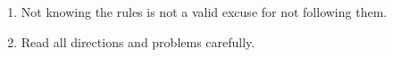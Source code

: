 \documentclass[12pt,fleqn]{exam}
\begin{document}
\begin{tcolorbox}
\begin{minipage}{6.5in}
\begin{enumerate}
    \item Not knowing the rules is not a valid excuse for not following them.
    
    \item Read all directions and problems carefully. 
    \end{enumerate} 
    \end{minipage} 
    
    \end{tcolorbox}
    
\end{document}
